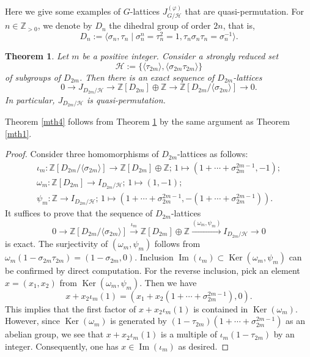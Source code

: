 \documentclass[12pt]{amsart}
\theoremstyle{plain}
\newtheorem{thm}{Theorem}[section]
\theoremstyle{definition}
\numberwithin{thm}{section}
\numberwithin{equation}{section}
\newcommand{\Zpn}{\mathbb{Z}_{>0}}
\newcommand{\Z}{\mathbb{Z}}
\newcommand{\cH}{\mathcal{H}}
\DeclareMathOperator{\Ker}{Ker}
\DeclareMathOperator{\Ima}{Im}
\begin{document}
Here we give some examples of $G$-lattices $J_{G/\cH}^{(\varphi)}$ that are quasi-permutation. For $n\in \Zpn$, we denote by $D_{n}$ the dihedral group of order $2n$, that is, 
\begin{equation*}
D_{n}:=\langle \sigma_{n},\tau_{n} \mid \sigma_{n}^{n}=\tau_{n}^{2}=1,\tau_{n}\sigma_{n}\tau_{n}=\sigma_{n}^{-1}\rangle. 
\end{equation*}

\begin{thm}\label{thm:dnqp}
Let $m$ be a positive integer. Consider a strongly reduced set 
\begin{equation*}
\cH:=\{\langle \tau_{2m} \rangle, \langle \sigma_{2m}\tau_{2m} \rangle \}
\end{equation*}
of subgroups of $D_{2m}$. Then there is an exact sequence of $D_{2m}$-lattices 
\begin{equation*}
    0\rightarrow J_{D_{2m}/\cH}\rightarrow \Z[D_{2m}]\oplus \Z \rightarrow \Z[D_{2m}/\langle \sigma_{2m} \rangle]\rightarrow 0. 
\end{equation*}
In particular, $J_{D_{2m}/\cH}$ is quasi-permutation. 
\end{thm}

Theorem \ref{mth4} follows from Theorem \ref{thm:dnqp} by the same argument as Theorem \ref{mth1}. 

\begin{proof}
Consider three homomorphisms of $D_{2m}$-lattices as follows: 
\begin{gather*}
\iota_{m}\colon \Z[D_{2m}/\langle \sigma_{2m}\rangle]\rightarrow \Z[D_{2m}]\oplus \Z;\,1\mapsto (1+\cdots +\sigma_{2m}^{2m-1},-1);\\
\omega_{m}\colon \Z[D_{2m}]\rightarrow I_{D_{2m}/\cH};\,1\mapsto (1,-1);\\
\psi_{m}\colon \Z \rightarrow I_{D_{2m}/\cH};\,1\mapsto 
(1+\cdots +\sigma_{2m}^{2m-1},-(1+\cdots +\sigma_{2m}^{2m-1})). 
\end{gather*}
It suffices to prove that the sequence of $D_{2m}$-lattices
\begin{equation}\label{eq:dnfl}
0\rightarrow \Z[D_{2m}/\langle \sigma_{2m}\rangle] \xrightarrow{\iota_{m}} \Z[D_{2m}]\oplus \Z \xrightarrow{(\omega_{m},\psi_{m})} I_{D_{2m}/\cH}\rightarrow 0
\end{equation}
is exact. The surjectivity of $(\omega_{m},\psi_{m})$ follows from $\omega_{m}(1-\sigma_{2m}\tau_{2m})=(1-\sigma_{2m},0)$. Inclusion $\Ima(\iota_{m})\subset \Ker(\omega_{m},\psi_{m})$ can be confirmed by direct computation. For the reverse inclusion, pick an element $x=(x_{1},x_{2})$ from $\Ker(\omega_{m},\psi_{m})$. Then we have
\begin{equation*}
x+x_{2}\iota_{m}(1)=(x_{1}+x_{2}(1+\cdots +\sigma_{2m}^{2m-1}),0). 
\end{equation*}
This implies that the first factor of $x+x_{2}\iota_{m}(1)$ is contained in $\Ker(\omega_{m})$. However, since $\Ker(\omega_{m})$ is generated by $(1-\tau_{2m})(1+\cdots+\sigma_{2m}^{2m-1})$ as an abelian group, we see that $x+x_{2}\iota_{m}(1)$ is a multiple of $\iota_{m}(1-\tau_{2m})$ by an integer. Consequently, one has $x\in \Ima(\iota_{m})$ as desired. 
\end{proof}
\end{document}
